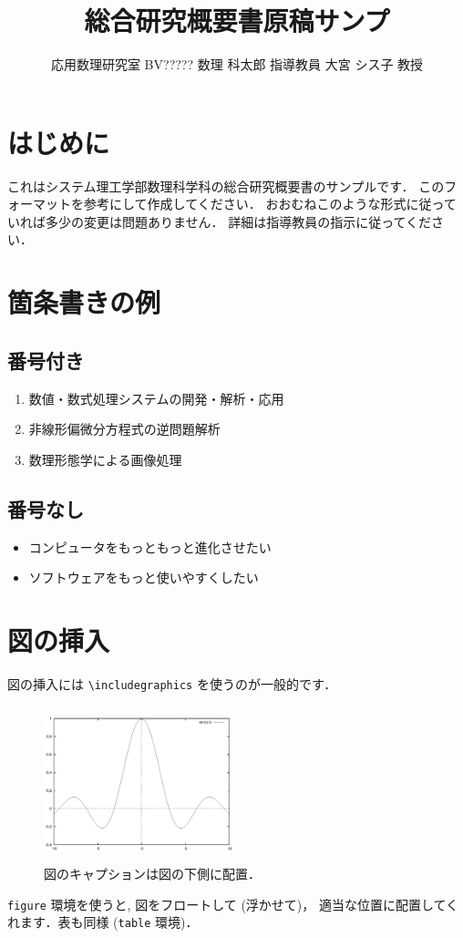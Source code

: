 \documentclass[twocolumn]{jarticle}
\title{
  \LARGE\bf
  総合研究概要書原稿サンプ \\[1ex]}
\author{応用数理研究室 \quad
        BV????? 数理 科太郎 \quad
        指導教員 大宮 シス子 教授}
\date{}
\begin{document}
\maketitle
\thispagestyle{empty}

\section{はじめに}
これはシステム理工学部数理科学科の総合研究概要書のサンプルです．
このフォーマットを参考にして作成してください．
おおむねこのような形式に従っていれば多少の変更は問題ありません．
詳細は指導教員の指示に従ってください．


\section{箇条書きの例}
\subsection{番号付き}
\begin{enumerate}
\item 数値・数式処理システムの開発・解析・応用
\item 非線形偏微分方程式の逆問題解析
\item 数理形態学による画像処理
\end{enumerate}
\subsection{番号なし}
\begin{itemize}
\item コンピュータをもっともっと進化させたい
\item ソフトウェアをもっと使いやすくしたい
\end{itemize}



\section{図の挿入}
図の挿入には \verb!\includegraphics! を使うのが一般的です．
\begin{figure}[h]
 \begin{center}
  \includegraphics[width=55mm,height=45mm,keepaspectratio]{fig.eps}
  \caption{図のキャプションは図の下側に配置．}
  \label{fig:test}
 \end{center}
\end{figure}
\verb!figure! 環境を使うと, 図をフロートして (浮かせて)，
適当な位置に配置してくれます．表も同様 (\verb!table! 環境)．
\end{document}
